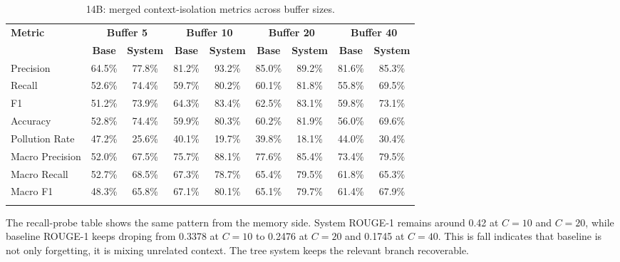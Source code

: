 \begin{table}[htbp]
\caption{14B: merged context-isolation metrics across buffer sizes.}\label{tab:14b_context_main}
\centering
\scriptsize
\setlength{\tabcolsep}{3pt}
\begin{adjustbox}{width=\textwidth}
\begin{tabular}{lcccccccc}
\toprule
\textbf{Metric} & \multicolumn{2}{c}{\textbf{Buffer 5}} & \multicolumn{2}{c}{\textbf{Buffer 10}} & \multicolumn{2}{c}{\textbf{Buffer 20}} & \multicolumn{2}{c}{\textbf{Buffer 40}} \\
\cmidrule(lr){2-3}\cmidrule(lr){4-5}\cmidrule(lr){6-7}\cmidrule(lr){8-9}
 & \textbf{Base} & \textbf{System} & \textbf{Base} & \textbf{System} & \textbf{Base} & \textbf{System} & \textbf{Base} & \textbf{System} \\
\midrule
Precision & 64.5\% & 77.8\% & 81.2\% & 93.2\% & 85.0\% & 89.2\% & 81.6\% & 85.3\% \\
Recall & 52.6\% & 74.4\% & 59.7\% & 80.2\% & 60.1\% & 81.8\% & 55.8\% & 69.5\% \\
F1 & 51.2\% & 73.9\% & 64.3\% & 83.4\% & 62.5\% & 83.1\% & 59.8\% & 73.1\% \\
Accuracy & 52.8\% & 74.4\% & 59.9\% & 80.3\% & 60.2\% & 81.9\% & 56.0\% & 69.6\% \\
Pollution Rate & 47.2\% & 25.6\% & 40.1\% & 19.7\% & 39.8\% & 18.1\% & 44.0\% & 30.4\% \\
Macro Precision & 52.0\% & 67.5\% & 75.7\% & 88.1\% & 77.6\% & 85.4\% & 73.4\% & 79.5\% \\
Macro Recall & 52.7\% & 68.5\% & 67.3\% & 78.7\% & 65.4\% & 79.5\% & 61.8\% & 65.3\% \\
Macro F1 & 48.3\% & 65.8\% & 67.1\% & 80.1\% & 65.1\% & 79.7\% & 61.4\% & 67.9\% \\
\botrule
\end{tabular}
\end{adjustbox}
\end{table}

The recall-probe table shows the same pattern from the memory side. System ROUGE-1 remains around 0.42 at $C=10$ and $C=20$, while baseline ROUGE-1 keeps droping from 0.3378 at $C=10$ to 0.2476 at $C=20$ and 0.1745 at $C=40$. This is fall indicates that baseline is not only forgetting, it is mixing unrelated context. The tree system keeps the relevant branch recoverable.


